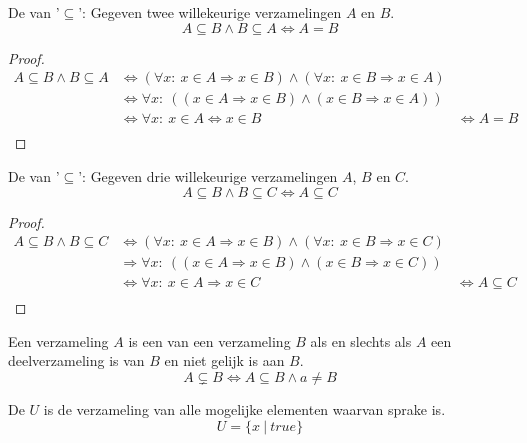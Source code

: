 \documentclass[main.tex]{subfiles}
\begin{document}
\begin{st}
  De  van '$\subseteq$': Gegeven twee willekeurige verzamelingen $A$ en $B$.
  \[ A \subseteq B \wedge B \subseteq A  \Leftrightarrow A = B \]
  \begin{proof}
    \[
    \begin{array}{cll}
      A \subseteq B \wedge B \subseteq A &\Leftrightarrow (\forall x:\ x \in A \Rightarrow x \in B) \wedge (\forall x:\ x \in B \Rightarrow x \in A) &\\
      & \Leftrightarrow \forall x:\ ((x \in A \Rightarrow x \in B) \wedge (x \in B \Rightarrow x \in A)) &\\
      & \Leftrightarrow \forall x:\ x \in A \Leftrightarrow x \in B &\Leftrightarrow A = B  \\
    \end{array}
    \]
  \end{proof}
\end{st}

\begin{st}
  De  van '$\subseteq$': Gegeven drie willekeurige verzamelingen $A$, $B$ en $C$.
  \[ A \subseteq B \wedge B \subseteq C  \Leftrightarrow A \subseteq C \]
  \begin{proof}
    \[
    \begin{array}{cll}
      A \subseteq B \wedge B \subseteq C &\Leftrightarrow (\forall x:\ x \in A \Rightarrow x \in B) \wedge (\forall x:\ x \in B \Rightarrow x \in C) &\\
      & \Rightarrow \forall x:\ ((x \in A \Rightarrow x \in B) \wedge (x \in B \Rightarrow x \in C)) &\\
      & \Leftrightarrow \forall x:\ x \in A \Rightarrow x \in C &\Leftrightarrow A \subseteq C  \\
    \end{array}
    \]
  \end{proof}
\end{st}

\begin{de}
  Een verzameling $A$ is een  van een verzameling $B$ als en slechts als $A$ een deelverzameling is van $B$ en niet gelijk is aan $B$.
  \[ A \subsetneq B \Leftrightarrow A \subseteq B \wedge a \neq B \]
\end{de}

\begin{de}
  De  $U$ is de verzameling van alle mogelijke elementen waarvan sprake is.
  \[ U = \{ x\ |\ true\} \]
\end{de}
\end{document}
